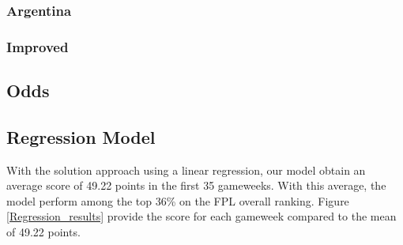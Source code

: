 \subsubsection{Argentina}

\subsubsection{Improved}


\subsection{Odds}

\newpage
\subsection{Regression Model}
With the solution approach using a linear regression, our model obtain an average score of 49.22 points in the first 35 gameweeks. With this average, the model perform among the top 36\% on the FPL overall ranking. Figure \ref{Regression_results} provide the score for each gameweek compared to the mean of 49.22 points. 

